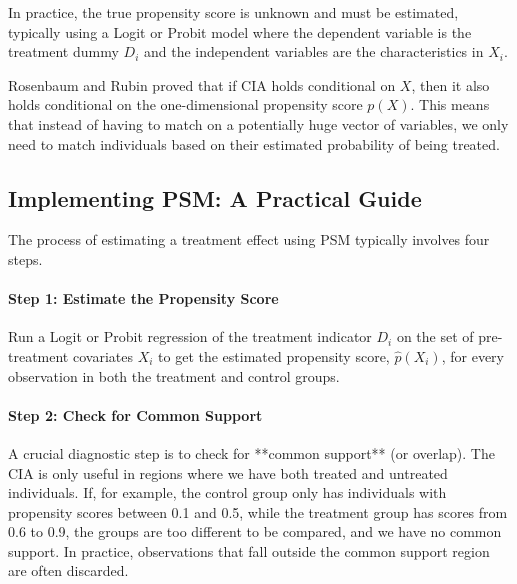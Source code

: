 \documentclass{article}
\begin{document}
In practice, the true propensity score is unknown and must be estimated, typically using a Logit or Probit model where the dependent variable is the treatment dummy $D_i$ and the independent variables are the characteristics in $X_i$.

Rosenbaum and Rubin proved that if CIA holds conditional on $X$, then it also holds conditional on the one-dimensional propensity score $p(X)$. This means that instead of having to match on a potentially huge vector of variables, we only need to match individuals based on their estimated probability of being treated.

\subsection{Implementing PSM: A Practical Guide}
\label{sub:psm_implementation}

The process of estimating a treatment effect using PSM typically involves four steps.

\paragraph{Step 1: Estimate the Propensity Score}
Run a Logit or Probit regression of the treatment indicator $D_i$ on the set of pre-treatment covariates $X_i$ to get the estimated propensity score, $\hat{p}(X_i)$, for every observation in both the treatment and control groups.

\paragraph{Step 2: Check for Common Support}
A crucial diagnostic step is to check for **common support** (or overlap). The CIA is only useful in regions where we have both treated and untreated individuals. If, for example, the control group only has individuals with propensity scores between 0.1 and 0.5, while the treatment group has scores from 0.6 to 0.9, the groups are too different to be compared, and we have no common support. In practice, observations that fall outside the common support region are often discarded.
\end{document}
